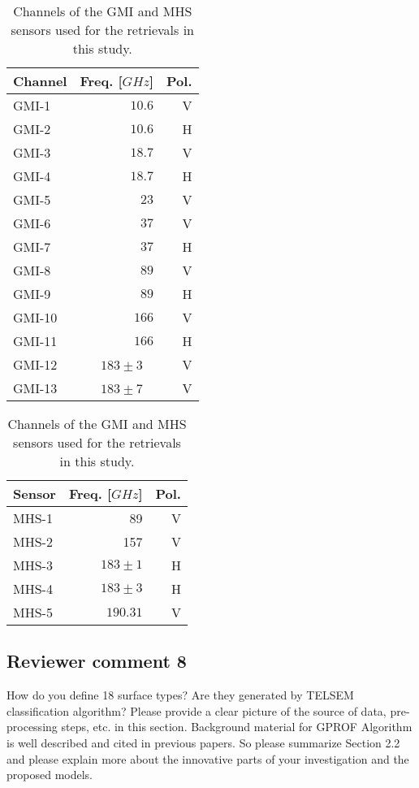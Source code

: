 \begin{table}[hbpt]
  \caption{Channels of the GMI and MHS sensors used for the retrievals in this study.}
  \label{tab:channels}
  \centering
  \begin{tabular}{lrr}
    Channel & Freq. [$\unit{GHz}$] & Pol. \\
    \hline
    GMI-1  & $10.6$ & V  \\
    GMI-2  & $10.6$ & H  \\
    GMI-3  & $18.7$ & V  \\
    GMI-4  & $18.7$ & H  \\
    GMI-5  & $23$   & V  \\
    GMI-6  & $37$   & V  \\
    GMI-7  & $37$   & H  \\
    GMI-8  & $89$   & V  \\
    GMI-9  & $89$   & H  \\
    GMI-10 & $166$ & V \\
    GMI-11 & $166$ & H  \\
    GMI-12 & $183 \pm 3$ \ & V \\
    GMI-13 & $183 \pm 7$ \ & V \\
  \end{tabular}%
  \hspace{1cm}
  \centering
  \begin{tabular}{lrr}
    Sensor & Freq. [$\unit{GHz}$] & Pol. \\
    \hline
    MHS-1 &  89 & V \\
    MHS-2 &  157 & V \\
    MHS-3 &  $183 \pm 1$ & H \\
    MHS-4 &  $183 \pm 3$ & H \\
    MHS-5 &  $190.31$ & V \\
  \end{tabular}
\end{table}

\subsection*{Reviewer comment 8}

How do you define 18 surface types? Are they generated by TELSEM classification
algorithm? Please provide a clear picture of the source of data, pre-processing
steps, etc. in this section. Background material for GPROF Algorithm is well
described and cited in previous papers. So please summarize Section 2.2 and
please explain more about the innovative parts of your investigation and the
proposed models.

